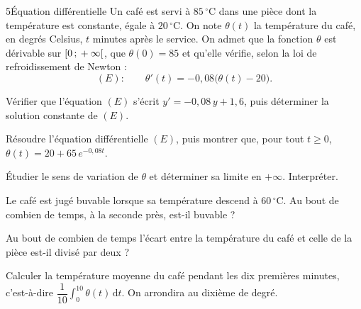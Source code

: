 \begin{exoBac}{5}{Équation différentielle}
Un café est servi à $85\,^\circ$C dans une pièce dont la température est constante, égale à $20\,^\circ$C. On note $\theta(t)$ la
température du café, en degrés Celsius, $t$ minutes après le service. On admet que la fonction $\theta$ est dérivable sur
$\mathopen{[}0\,{;}\,+\infty\mathclose{[}$, que $\theta(0)=85$ et qu'elle vérifie, selon la loi de refroidissement de Newton :
\[(E):\qquad \theta'(t)=-0{,}08\big(\theta(t)-20\big).\]
\begin{questions}
  \item Vérifier que l'équation $(E)$ s'écrit $y'=-0{,}08\,y+1{,}6$, puis déterminer la solution constante de $(E)$.
  \item Résoudre l'équation différentielle $(E)$, puis montrer que, pour tout $t\geq0$, $\theta(t)=20+65\,e^{-0{,}08t}$.
  \item Étudier le sens de variation de $\theta$ et déterminer sa limite en $+\infty$. Interpréter.
  \item Le café est jugé buvable lorsque sa température descend à $60\,^\circ$C. Au bout de combien de temps, à la seconde près,
    est-il buvable ?
  \item Au bout de combien de temps l'écart entre la température du café et celle de la pièce est-il divisé par deux ?
  \item Calculer la température moyenne du café pendant les dix premières minutes, c'est-à-dire
    $\dfrac{1}{10}\displaystyle\int_0^{10}\theta(t)\,\mathrm{d}t$. On arrondira au dixième de degré.
\end{questions}
\end{exoBac}

